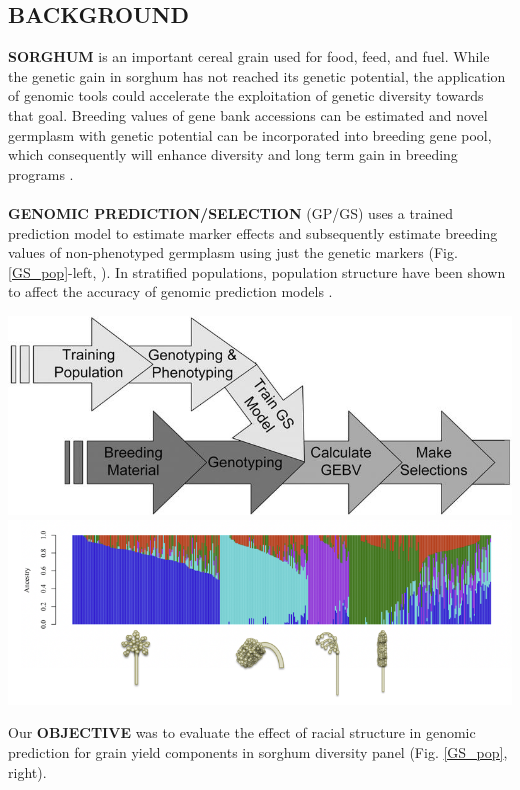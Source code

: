 \documentclass[a0,portrait]{a0poster}
\begin{document}
\begin{minipage}[c]{\linewidth}
\begin{framed}
\begin{multicols}{2}
\section*{BACKGROUND}
\textbf{SORGHUM} is an important cereal grain used for food, feed, and fuel. While the genetic gain in sorghum has not reached its genetic potential, the application of genomic tools could accelerate the exploitation of genetic diversity towards that goal. Breeding values of gene bank accessions can be estimated and novel germplasm with genetic potential can be incorporated into breeding gene pool, which consequently will enhance diversity and long term gain in breeding programs \citep{gorjanc2018optimal,yu2016genomic}.\\\\
\textbf{GENOMIC PREDICTION/SELECTION} (GP/GS) uses a trained prediction model to estimate marker effects and subsequently estimate breeding values of non-phenotyped germplasm using just the genetic markers (Fig. \ref{GS_pop}-left, \citep{Meuwissen1819}). In stratified populations, population structure have been shown to affect the accuracy of genomic prediction models \citep{guo2014impact}.\\
\begin{center}
\hspace*{\fill}
\includegraphics[width=0.49\linewidth]{figures/GS_process}
\includegraphics[trim={0 0.9cm 0 0},clip,width=0.49\linewidth]{figures/PopStr_SAP}
\label{GS_pop}
\end{center}

\smallskip
Our \textbf{OBJECTIVE} was to evaluate the effect of racial structure in genomic prediction for grain yield components in sorghum diversity panel (Fig. \ref{GS_pop}, right).\\


\end{multicols}
\end{framed}
\end{minipage}
\end{document}
